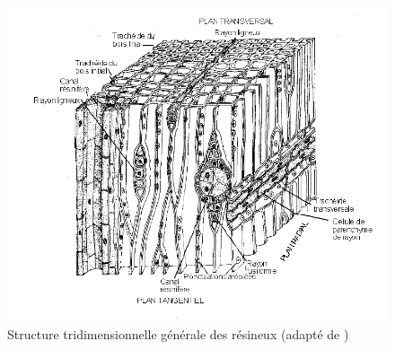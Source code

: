 \begin{figure}[h]
\centering
\includegraphics[scale=0.7]{img/ch3_Fahn}
\caption{Structure tridimensionnelle générale des résineux (adapté de \cite{fahn1990plant})}
\label{fig:Fahn}
\end{figure}




%
%
%
